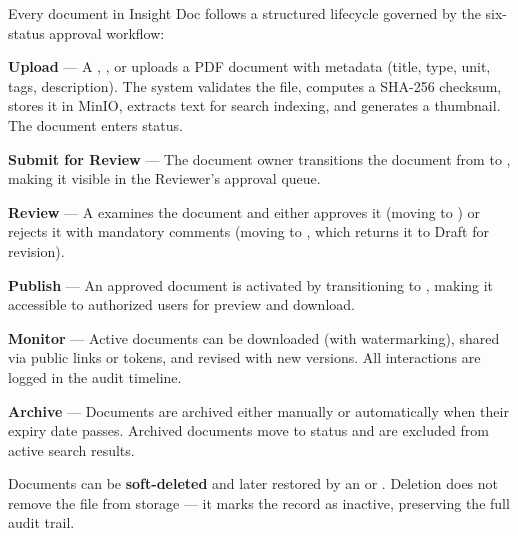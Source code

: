 Every document in Insight Doc follows a structured lifecycle
governed by the six-status approval workflow:

\begin{ugSteps}
  \item \textbf{Upload} --- A , ,
    or  uploads a PDF document with metadata
    (title, type, unit, tags, description). The system validates
    the file, computes a SHA-256 checksum, stores it in MinIO,
    extracts text for search indexing, and generates a thumbnail.
    The document enters  status.

  \item \textbf{Submit for Review} --- The document owner
    transitions the document from
     to
    , making it visible in the
    Reviewer's approval queue.

  \item \textbf{Review} --- A  examines the
    document and either approves it (moving to
    ) or rejects it with mandatory
    comments (moving to , which
    returns it to Draft for revision).

  \item \textbf{Publish} --- An approved document is activated
    by transitioning to , making it
    accessible to authorized users for preview and download.

  \item \textbf{Monitor} --- Active documents can be downloaded
    (with watermarking), shared via public links or tokens,
    and revised with new versions. All interactions are logged
    in the audit timeline.

  \item \textbf{Archive} --- Documents are archived either
    manually or automatically when their expiry date passes.
    Archived documents move to
     status and are excluded
    from active search results.
\end{ugSteps}

\begin{ugTip}
  Documents can be \textbf{soft-deleted} and later restored by an
   or . Deletion does not remove
  the file from storage --- it marks the record as inactive,
  preserving the full audit trail.
\end{ugTip}

